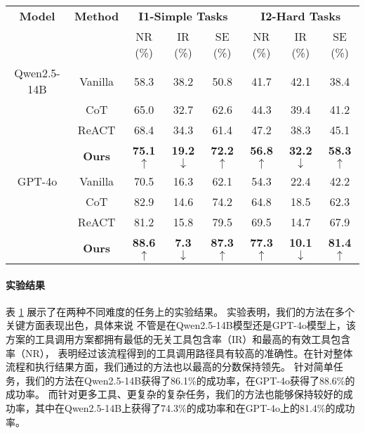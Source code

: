 \begin{table}[!ht]
  \centering
  \begin{tabular}{c|c|ccc|ccc}
  \toprule
  \textbf{Model} & \textbf{Method} & \multicolumn{3}{c|}{\textbf{I1-Simple Tasks}} & \multicolumn{3}{c}{\textbf{I2-Hard Tasks}} \\
  & & NR (\%) & IR (\%) & SE (\%) & NR (\%) & IR (\%) & SE (\%) \\
  \midrule
  Qwen2.5-14B & Vanilla          & 58.3 & 38.2 & 50.8 & 41.7 & 42.1 & 38.4 \\
              & CoT              & 65.0 & 32.7 & 62.6 & 44.3 & 39.4 & 41.2 \\
              & ReACT            & 68.4 & 34.3 & 61.4 & 47.2 & 38.3 & 45.1 \\
              & \textbf{Ours}    & \textbf{75.1} $\uparrow$ & \textbf{19.2} $\downarrow$  & \textbf{72.2} $\uparrow$ & \textbf{56.8} $\uparrow$ & \textbf{32.2} $\downarrow$ & \textbf{58.3} $\uparrow$ \\
  \midrule
  GPT-4o   & Vanilla          & 70.5 & 16.3 & 62.1 & 54.3 & 22.4 & 42.2 \\
           & CoT              & 82.9 & 14.6 & 74.2 & 64.8 & 18.5 & 62.3 \\
           & ReACT            & 81.2 & 15.8 & 79.5 & 69.5 & 14.7 & 67.9 \\
           & \textbf{Ours}    & \textbf{88.6} $\uparrow$ & \textbf{7.3} $\downarrow$  & \textbf{87.3} $\uparrow$ & \textbf{77.3} $\uparrow$ & \textbf{10.1} $\downarrow$ & \textbf{81.4} $\uparrow$ \\
  \bottomrule
  \end{tabular}
  \label{tab:detailed_evaluation}
\end{table}

\paragraph{实验结果}

表 \ref{tab:detailed_evaluation} 展示了在两种不同难度的任务上的实验结果。
实验表明，我们的方法在多个关键方面表现出色，具体来说
不管是在Qwen2.5-14B模型还是GPT-4o模型上，该方案的工具调用方案都拥有最低的无关工具包含率（IR）和最高的有效工具包含率（NR），
表明经过该流程得到的工具调用路径具有较高的准确性。在针对整体流程和执行结果方面，我们通过的方法也以最高的分数保持领先。
针对简单任务，我们的方法在Qwen2.5-14B获得了86.1\%的成功率，在GPT-4o获得了88.6\%的成功率。
而针对更多工具、更复杂的复杂任务，我们的方法也能够保持较好的成功率，其中在Qwen2.5-14B上获得了74.3\%的成功率和在GPT-4o上的81.4\%的成功率。

